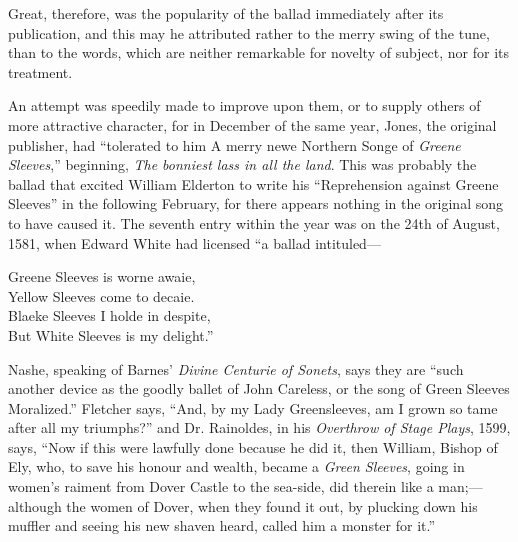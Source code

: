 Great, therefore, was the popularity of the ballad immediately after its publication, 
and this may he attributed rather to the merry swing of the tune, than to the
words, which are neither remarkable for novelty of subject, nor for its treatment.

An attempt was speedily made to improve upon them, or to supply others of
more attractive character, for in December of the same year, Jones, the original
publisher, had “tolerated to him A merry newe Northern Songe of \textit{Greene
Sleeves},” beginning, \textit{The bonniest lass in all the land}. This was probably the ballad
that excited William Elderton to write his “Reprehension against Greene Sleeves”
in the following February, for there appears nothing in the original song to have
caused it. The seventh entry within the year was on the 24th of August, 1581,
when Edward White had licensed “a ballad intituled—
\settowidth{\versewidth}{Greene Sleeves is worne awaie,}
\begin{scverse}
Greene Sleeves is worne awaie,\\
Yellow Sleeves come to decaie.\\
Blaeke Sleeves I holde in despite,\\
But White Sleeves is my delight.”
\end{scverse}

Nashe, speaking of Barnes’ \textit{Divine Centurie of Sonets}, says they are “such
another device as the goodly ballet of John Careless, or the song of Green Sleeves
Moralized.” Fletcher says, “And, by my Lady Greensleeves, am I grown so
tame after all my triumphs?” and Dr. Rainoldes, in his \textit{Overthrow of Stage
Plays}, 1599, says, “Now if this were lawfully done because he did it, then
William, Bishop of Ely, who, to save his honour and wealth, became a \textit{Green
Sleeves}, going in women’s raiment from Dover Castle to the sea-side, did therein
like a man;—although the women of Dover, when they found it out, by plucking
down his muffler and seeing his new shaven heard, called him a monster for it.”

